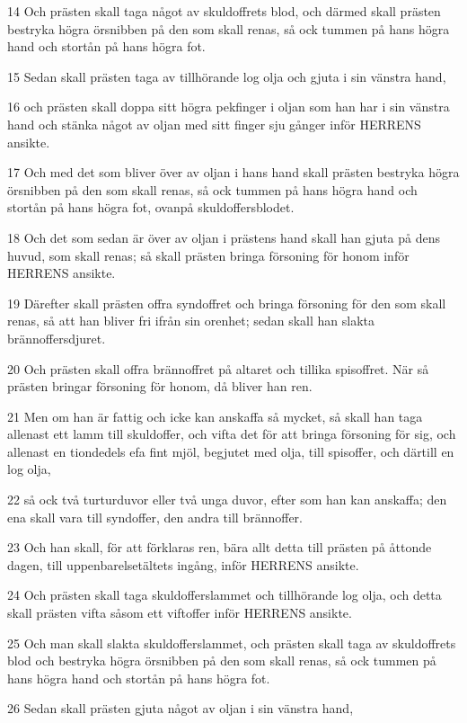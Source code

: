\par 14 Och prästen skall taga något av skuldoffrets blod, och därmed skall prästen bestryka högra örsnibben på den som skall renas, så ock tummen på hans högra hand och stortån på hans högra fot.
\par 15 Sedan skall prästen taga av tillhörande log olja och gjuta i sin vänstra hand,
\par 16 och prästen skall doppa sitt högra pekfinger i oljan som han har i sin vänstra hand och stänka något av oljan med sitt finger sju gånger inför HERRENS ansikte.
\par 17 Och med det som bliver över av oljan i hans hand skall prästen bestryka högra örsnibben på den som skall renas, så ock tummen på hans högra hand och stortån på hans högra fot, ovanpå skuldoffersblodet.
\par 18 Och det som sedan är över av oljan i prästens hand skall han gjuta på dens huvud, som skall renas; så skall prästen bringa försoning för honom inför HERRENS ansikte.
\par 19 Därefter skall prästen offra syndoffret och bringa försoning för den som skall renas, så att han bliver fri ifrån sin orenhet; sedan skall han slakta brännoffersdjuret.
\par 20 Och prästen skall offra brännoffret på altaret och tillika spisoffret. När så prästen bringar försoning för honom, då bliver han ren.
\par 21 Men om han är fattig och icke kan anskaffa så mycket, så skall han taga allenast ett lamm till skuldoffer, och vifta det för att bringa försoning för sig, och allenast en tiondedels efa fint mjöl, begjutet med olja, till spisoffer, och därtill en log olja,
\par 22 så ock två turturduvor eller två unga duvor, efter som han kan anskaffa; den ena skall vara till syndoffer, den andra till brännoffer.
\par 23 Och han skall, för att förklaras ren, bära allt detta till prästen på åttonde dagen, till uppenbarelsetältets ingång, inför HERRENS ansikte.
\par 24 Och prästen skall taga skuldofferslammet och tillhörande log olja, och detta skall prästen vifta såsom ett viftoffer inför HERRENS ansikte.
\par 25 Och man skall slakta skuldofferslammet, och prästen skall taga av skuldoffrets blod och bestryka högra örsnibben på den som skall renas, så ock tummen på hans högra hand och stortån på hans högra fot.
\par 26 Sedan skall prästen gjuta något av oljan i sin vänstra hand,
